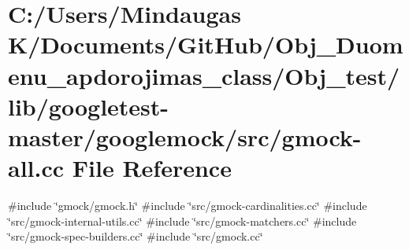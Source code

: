 \hypertarget{_obj__test_2lib_2googletest-master_2googlemock_2src_2gmock-all_8cc}{}\section{C\+:/\+Users/\+Mindaugas K/\+Documents/\+Git\+Hub/\+Obj\+\_\+\+Duomenu\+\_\+apdorojimas\+\_\+class/\+Obj\+\_\+test/lib/googletest-\/master/googlemock/src/gmock-\/all.cc File Reference}
\label{_obj__test_2lib_2googletest-master_2googlemock_2src_2gmock-all_8cc}
{\ttfamily \#include \char`\"{}gmock/gmock.\+h\char`\"{}}\newline
{\ttfamily \#include \char`\"{}src/gmock-\/cardinalities.\+cc\char`\"{}}\newline
{\ttfamily \#include \char`\"{}src/gmock-\/internal-\/utils.\+cc\char`\"{}}\newline
{\ttfamily \#include \char`\"{}src/gmock-\/matchers.\+cc\char`\"{}}\newline
{\ttfamily \#include \char`\"{}src/gmock-\/spec-\/builders.\+cc\char`\"{}}\newline
{\ttfamily \#include \char`\"{}src/gmock.\+cc\char`\"{}}\newline
